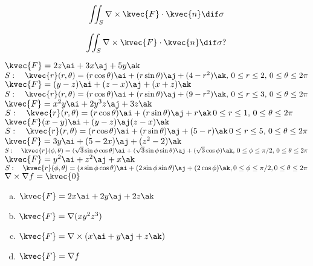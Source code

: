 \begin{align*}
\iint_S \nabla \times \kvec{F} \cdot \kvec{n} \dif \sigma
\end{align*}

\begin{align*}
\iint_S \nabla \times \kvec{F} \cdot \kvec{n} \dif \sigma ?
\end{align*}

\( \kvec{F} = 2z \ai + 3x \aj + 5y \ak \) \\
\( S: \quad \kvec{r} (r,\theta) = (r\cos\theta) \ai + (r\sin\theta ) \aj + (4-r^2) \ak, \, 0 \le r \le 2,\, 0 \le \theta \le 2 \pi \) \\

\( \kvec{F} =(y-z) \ai + (z-x) \aj + (x+z) \ak \) \\
\( S: \quad \kvec{r} (r,\theta) = (r\cos\theta) \ai + (r\sin\theta ) \aj + (9-r^2) \ak, \, 0 \le r \le 3,\, 0 \le \theta \le 2 \pi \) \\

\( \kvec{F} = x^2 y \ai + 2y^3 z \aj + 3z \ak \) \\
\( S: \quad \kvec{r} (r,\theta) = (r\cos\theta) \ai + (r\sin\theta ) \aj + r\ak \, 0 \le r \le 1, \, 0 \le \theta \le 2 \pi \) \\

\( \kvec{F} (x-y) \ai + ( y-z) \aj (z-x) \ak \) \\
\( S: \quad \kvec{r} (r,\theta) = (r\cos\theta) \ai + (r\sin\theta ) \aj + (5-r) \ak \, 0 \le r \le 5, \, 0 \le \theta \le 2 \pi \) \\

\( \kvec{F} = 3y \ai + (5-2x) \aj + (z^2 -2) \ak \) \\
\( S: \quad \kvec{r} (\phi, \theta ) = ( \sqrt{3} \sin \phi \cos\theta ) \ai + ( \sqrt{3} \sin \phi \sin\theta ) \aj + ( \sqrt{3}\cos\phi ) \ak , \, 0\le \phi \le \pi/2 , \, 0 \le \theta \le 2\pi \) \\

\( \kvec{F} = y^2 \ai + z^2 \aj + x\ak \) \\
\( S: \quad \kvec{r} (\phi, \theta ) = ( s \sin \phi \cos \theta ) \ai + (2 \sin\phi \sin\theta) \aj + (2 \cos\phi) \ak , 0 \le \phi \le \pi/2 , 0 \le \theta \le 2\pi \) \\

\( \nabla \times \nabla f = \kvec {0} \) \\

\begin{enumerate}[a.]
\item
\( \kvec{F} = 2x \ai + 2y \aj + 2z \ak \) 
\item
\( \kvec{F} = \nabla (xy^{2}z^{3}) \)
\item
\( \kvec{F} = \nabla \times (x\ai + y\aj + z\ak) \) 
\item
\( \kvec{F} = \nabla f  \)
\end{enumerate}

